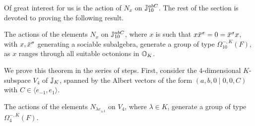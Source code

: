 Of great interest for us is the action of $N_x$ on $\mathbb{J}_{10}^{abC}$. The rest of the section
is devoted to proving the following result.

\begin{theorem}
	\label{theorem:3_nx_omega}
	The actions of the elements $N_x$ on $\mathbb{J}_{10}^{abC}$, where $x$ is such that 
	$x \ovx^{\s} = 0 = \ovx^{\s} x$, with $x,\mathord{\mbox{\hspace*{0pt}}\,\overline{\!x\!\!\;}\!\:}\mbox{\hspace*{0pt}}^{\sigma}$ generating a sociable subalgebra, 
	generate a group of type $\Omega_{10}^{-,K}(F)$, as $x$ ranges through all suitable octonions
	in $\mathbb{O}_K$.  
\end{theorem}

We prove this theorem in the series of steps. First, consider the $4$-dimensional 
$K$-subspace $V_4$ of $\mathbb{J}_K$, 
spanned by the Albert vectors of the form $(a,b,0\mid 0,0,C)$ with 
$C \in \langle e_{-1}, e_{1} \rangle$. 

\begin{lemma}
	The actions of the elements $N_{\lambda e_{ \pm 1 }}$ on $V_4$, where $\lambda \in K$, 
	generate a group of type $\Omega_4^{-,K}(F)$. 
\end{lemma}

